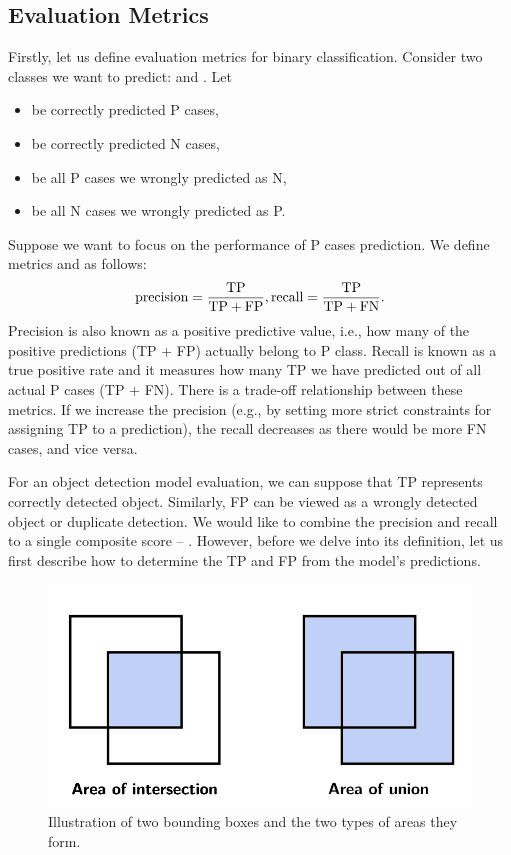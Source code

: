 \subsection{Evaluation Metrics}
Firstly, let us define evaluation metrics for binary classification. Consider
two classes we want to predict:  and . Let
\begin{itemize}
    \item {} be correctly predicted P cases,
    \item {} be correctly predicted N cases,
    \item {} be all P cases we wrongly predicted as N,
    \item {} be all N cases we wrongly predicted as P.
\end{itemize}
Suppose we want to focus on the performance of P cases prediction. We define
metrics  and  as follows:
$$
    \text{precision} = \frac{\text{TP}}{\text{TP} + \text{FP}}, \\
    \text{recall} = \frac{\text{TP}}{\text{TP} + \text{FN}}.
$$
Precision is also known as a positive predictive value, i.e., how many of the
positive predictions (TP + FP) actually belong to P class. Recall is known as a
true positive rate and it measures how many TP we have predicted out of all
actual P cases (TP + FN). There is a trade-off relationship between these
metrics. If we increase the precision (e.g., by setting more strict constraints
for assigning TP to a prediction), the recall decreases as there would be more
FN cases, and vice versa.

For an object detection model evaluation, we can suppose that TP represents
correctly detected object. Similarly, FP can be viewed as a wrongly detected
object or duplicate detection. We would like to combine the precision and recall
to a single composite score -- . However,
before we delve into its definition, let us first describe how to determine the
TP and FP from the model's predictions.

\begin{figure}[H]
    \centering
    \includegraphics[width=0.6\linewidth]{Sources/Figures/iou.png}
    \caption{Illustration of two bounding boxes and the two types of areas they
        form.}
    \label{fig:iou}
\end{figure}

